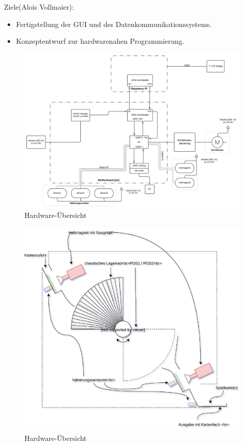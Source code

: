 Ziele(Alois Vollmaier):
\begin{itemize}
    \item Fertigstellung der GUI und des Datenkommunikationssystems.
    \item Konzeptentwurf zur hardwarenahen Programmierung.
\end{itemize}

\begin{landscape}
    \begin{figure}
        \centering
        \noindent\includegraphics[width=\linewidth,height=.9\textheight,keepaspectratio]{fig/Hardware-Ubersicht-05062019.pdf}
        \caption[Beispielbild]{Hardware-Übersicht}
        \label{Hardware-Übersicht}
    \end{figure}
\end{landscape}

\begin{figure}[H]
    \vspace{40pt}
    \centering
    \includegraphics[width=1\textwidth]{fig/Reshuffled_Version_3_0_prinzip}
    \caption{Hardware-Übersicht}
    \label{Mechanik}
\end{figure}

